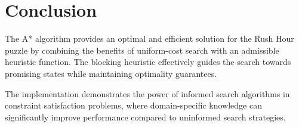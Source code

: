 \documentclass[12pt,a4paper]{article}
\begin{document}
\section{Conclusion}

The A* algorithm provides an optimal and efficient solution for the Rush Hour puzzle by combining the benefits of uniform-cost search with an admissible heuristic function. The blocking heuristic effectively guides the search towards promising states while maintaining optimality guarantees.

The implementation demonstrates the power of informed search algorithms in constraint satisfaction problems, where domain-specific knowledge can significantly improve performance compared to uninformed search strategies.
\end{document}
